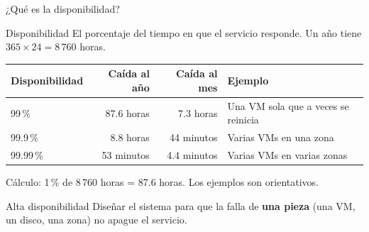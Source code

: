\documentclass[aspectratio=169,10pt,c]{beamer}
\begin{document}
\begin{frame}{¿Qué es la disponibilidad?}
\begin{block}{Disponibilidad}
\small El porcentaje del tiempo en que el servicio responde. Un año tiene $365 \times 24 = 8\,760$ horas.
\end{block}
\renewcommand{\arraystretch}{1.3}
\centering\small
\begin{tabular}{@{}lrr>{\raggedright\arraybackslash}p{5.2cm}@{}}
\toprule
\textbf{Disponibilidad} & \textbf{Caída al año} & \textbf{Caída al mes} & \textbf{Ejemplo}\\
\midrule
99\,\% & 87.6 horas & 7.3 horas & Una VM sola que a veces se reinicia\\
99.9\,\% & 8.8 horas & 44 minutos & Varias VMs en una zona\\
99.99\,\% & 53 minutos & 4.4 minutos & Varias VMs en varias zonas\\
\bottomrule
\end{tabular}
\par\vspace{2mm}
{\scriptsize\color{utpGris} Cálculo: 1\,\% de 8\,760 horas = 87.6 horas. Los ejemplos son orientativos.}
\par\vspace{2mm}
\begin{alertblock}{Alta disponibilidad}
\small Diseñar el sistema para que la falla de \textbf{una pieza} (una VM, un disco, una zona) no apague el servicio.
\end{alertblock}
\end{frame}
\end{document}
